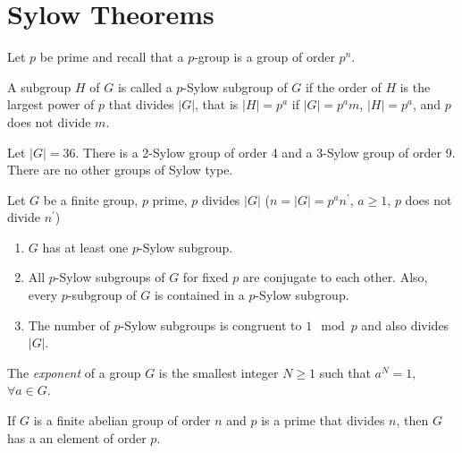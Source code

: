 \documentclass{article}
\begin{document}
\section{Sylow Theorems}
Let $p$ be prime and recall that a $p$-group is a group of order
$p^n$.

\begin{defn}
A subgroup $H$ of $G$ is called a $p$-Sylow subgroup of $G$ if the
order of $H$ is the largest power of $p$ that divides $|G|$, that is
$|H| = p^a$ if $|G| = p^a m$, $|H| = p^a$, and $p$ does not divide $m$.
\end{defn}

\begin{xmpl}
Let $|G| = 36$. There is a 2-Sylow group of order 4 and a 3-Sylow
group of order 9. There are no other groups of Sylow type.
\end{xmpl}

\begin{theorem}
  Let $G$ be a finite group, $p$ prime, $p$ divides $|G|$
  ($n = |G| = p^a n^\prime$, $a \geq 1$, $p$ does not divide $n^\prime$)
  \begin{enumerate}
    \item{$G$ has at least one $p$-Sylow subgroup.
         }
    \item{All $p$-Sylow subgroups of $G$ for fixed $p$ are conjugate
          to each other. Also, every $p$-subgroup of $G$ is contained
          in a $p$-Sylow subgroup.
         }
    \item{The number of $p$-Sylow subgroups is congruent to $1 \mod p$
          and also divides $|G|$.
         }
  \end{enumerate}
\end{theorem}

\begin{defn}
The \emph{exponent} of a group $G$ is the smallest integer $N \geq 1$
such that $a^N = 1,$ $\forall a \in G$.
\end{defn}

\begin{lemma}
If $G$ is a finite abelian group of order $n$ and $p$ is a prime that
divides $n$, then $G$ has a an element of order $p$.
\end{lemma}
\end{document}

